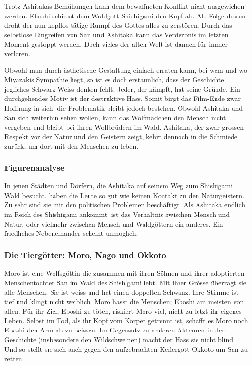 Trotz Ashitakas Bemühungen kann dem bewaffneten Konflikt nicht ausgewichen werden. Eboshi schiesst dem Waldgott Shishigami den Kopf ab. Als Folge dessen droht der nun kopflos tätige Rumpf des Gottes alles zu zerstören. Durch das selbstlose Eingreifen von San und Ashitaka kann das Verderbnis im letzten Moment gestoppt werden. Doch vieles der alten Welt ist danach für immer verloren.

Obwohl man durch ästhetische Gestaltung einfach erraten kann, bei wem und wo Miyazakis Sympathie liegt, so ist es doch erstaunlich, dass der Geschichte jegliches Schwarz-Weiss denken fehlt. Jeder, der kämpft, hat seine Gründe. Ein durchgehendes Motiv ist der destruktive Hass. Somit birgt das Film-Ende zwar Hoffnung in sich, die Problematik bleibt jedoch bestehen. 
Obwohl Ashitaka und San sich weiterhin sehen wollen, kann das Wolfmädchen den Mensch nicht vergeben und bleibt bei ihren Wolfbrüdern im Wald. Ashitaka, der zwar grossen Respekt vor der Natur und den Geistern zeigt, kehrt dennoch in die Schmiede zurück, um dort mit den Menschen zu leben.  

\subsubsection{Figurenanalyse}
In jenen Städten und Dörfern, die Ashitaka auf seinem Weg zum Shishigami Wald besucht, haben die Leute so gut wie keinen Kontakt zu den Naturgeistern. Zu sehr sind sie mit den politischen Problemen beschäftigt. Als Ashitaka endlich im Reich des Shishigami ankommt, ist das Verhältnis zwischen Mensch und Natur, oder vielmehr zwischen Mensch und Waldgöttern ein anderes. Ein friedliches Nebeneinander scheint unmöglich. 

\subsubsection*{Die Tiergötter: Moro, Nago und Okkoto}
Moro ist eine Wolfsgöttin die zusammen mit ihren Söhnen und ihrer adoptierten Menschentochter San im Wald des Shishigami lebt. Mit ihrer Grösse überragt sie alle Menschen. Sie ist weiss und hat einen doppelten Schwanz. Ihre Stimme ist tief und klingt nicht weiblich. Moro hasst die Menschen; Eboshi am meisten von allen. Für ihr Ziel, Eboshi zu töten, riskiert Moro viel, nicht zu letzt ihr eigenes Leben. Selbst im Tod, als ihr Kopf vom Körper getrennt ist, schafft es Moro noch Eboshi den Arm ab zu beissen. Im Gegensatz zu anderen Akteuren in der Geschichte (insbesondere den Wildschweinen) macht der Hass sie nicht blind. Und so stellt sie sich auch gegen den aufgebrachten Keilergott Okkoto um San zu retten.

